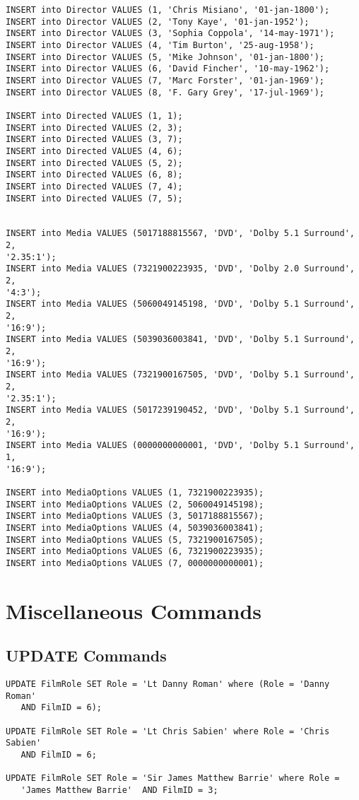 \documentclass[a4paper,12pt]{article}
\begin{document}
\begin{verbatim}
INSERT into Director VALUES (1, 'Chris Misiano', '01-jan-1800');
INSERT into Director VALUES (2, 'Tony Kaye', '01-jan-1952');
INSERT into Director VALUES (3, 'Sophia Coppola', '14-may-1971');
INSERT into Director VALUES (4, 'Tim Burton', '25-aug-1958');
INSERT into Director VALUES (5, 'Mike Johnson', '01-jan-1800');
INSERT into Director VALUES (6, 'David Fincher', '10-may-1962');
INSERT into Director VALUES (7, 'Marc Forster', '01-jan-1969');
INSERT into Director VALUES (8, 'F. Gary Grey', '17-jul-1969');

INSERT into Directed VALUES (1, 1);
INSERT into Directed VALUES (2, 3);
INSERT into Directed VALUES (3, 7);
INSERT into Directed VALUES (4, 6);
INSERT into Directed VALUES (5, 2);
INSERT into Directed VALUES (6, 8);
INSERT into Directed VALUES (7, 4);
INSERT into Directed VALUES (7, 5);


INSERT into Media VALUES (5017188815567, 'DVD', 'Dolby 5.1 Surround', 2,
'2.35:1');
INSERT into Media VALUES (7321900223935, 'DVD', 'Dolby 2.0 Surround', 2,
'4:3');
INSERT into Media VALUES (5060049145198, 'DVD', 'Dolby 5.1 Surround', 2,
'16:9');
INSERT into Media VALUES (5039036003841, 'DVD', 'Dolby 5.1 Surround', 2,
'16:9');
INSERT into Media VALUES (7321900167505, 'DVD', 'Dolby 5.1 Surround', 2,
'2.35:1');
INSERT into Media VALUES (5017239190452, 'DVD', 'Dolby 5.1 Surround', 2,
'16:9');
INSERT into Media VALUES (0000000000001, 'DVD', 'Dolby 5.1 Surround', 1,
'16:9');

INSERT into MediaOptions VALUES (1, 7321900223935);
INSERT into MediaOptions VALUES (2, 5060049145198);
INSERT into MediaOptions VALUES (3, 5017188815567);
INSERT into MediaOptions VALUES (4, 5039036003841);
INSERT into MediaOptions VALUES (5, 7321900167505);
INSERT into MediaOptions VALUES (6, 7321900223935);
INSERT into MediaOptions VALUES (7, 0000000000001);
\end{verbatim}

\section{Miscellaneous Commands}

\subsection{UPDATE Commands}

\begin{verbatim}
UPDATE FilmRole SET Role = 'Lt Danny Roman' where (Role = 'Danny Roman'
   AND FilmID = 6);

UPDATE FilmRole SET Role = 'Lt Chris Sabien' where Role = 'Chris Sabien'
   AND FilmID = 6;

UPDATE FilmRole SET Role = 'Sir James Matthew Barrie' where Role =
   'James Matthew Barrie'  AND FilmID = 3;
\end{verbatim}
\end{document}
